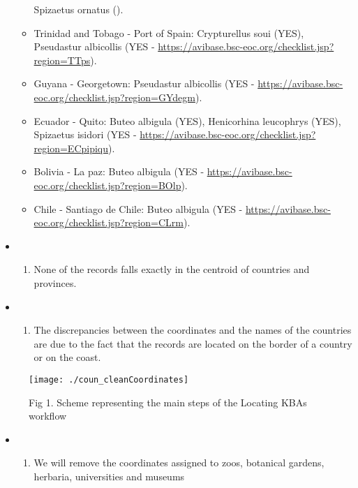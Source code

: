 \documentclass[
]{article}
\providecommand{\tightlist}{%
  \setlength{\itemsep}{0pt}\setlength{\parskip}{0pt}}
\begin{document}
\begin{itemize}
\begin{itemize}
    Spizaetus ornatus ().
  \item
    Trinidad and Tobago - Port of Spain: Crypturellus soui (YES),
    Pseudastur albicollis (YES -
    \url{https://avibase.bsc-eoc.org/checklist.jsp?region=TTps}).
  \item
    Guyana - Georgetown: Pseudastur albicollis (YES -
    \url{https://avibase.bsc-eoc.org/checklist.jsp?region=GYdegm}).
  \item
    Ecuador - Quito: Buteo albigula (YES), Henicorhina leucophrys (YES),
    Spizaetus isidori (YES -
    \url{https://avibase.bsc-eoc.org/checklist.jsp?region=ECpipiqu}).
  \item
    Bolivia - La paz: Buteo albigula (YES -
    \url{https://avibase.bsc-eoc.org/checklist.jsp?region=BOlp}).
  \item
    Chile - Santiago de Chile: Buteo albigula (YES -
    \url{https://avibase.bsc-eoc.org/checklist.jsp?region=CLrm}).
  \end{itemize}
\item
  \begin{enumerate}
  \def\labelenumi{\arabic{enumi}.}
  \setcounter{enumi}{1}
  \tightlist
  \item
    None of the records falls exactly in the centroid of countries and
    provinces.
  \end{enumerate}
\item
  \begin{enumerate}
  \def\labelenumi{\arabic{enumi}.}
  \setcounter{enumi}{2}
  \tightlist
  \item
    The discrepancies between the coordinates and the names of the
    countries are due to the fact that the records are located on the
    border of a country or on the coast.
  \end{enumerate}
\end{itemize}

\begin{figure}

{\centering \texttt{[image: ./coun\_cleanCoordinates]} 

}

\caption{Fig 1. Scheme representing the main steps of the Locating KBAs workflow}\label{fig:gaps map 1}
\end{figure}

\begin{itemize}
\item
  \begin{enumerate}
  \def\labelenumi{\arabic{enumi}.}
  \setcounter{enumi}{3}
  \tightlist
  \item
    We will remove the coordinates assigned to zoos, botanical gardens,
    herbaria, universities and museums
  \end{enumerate}
\end{itemize}
\end{document}
